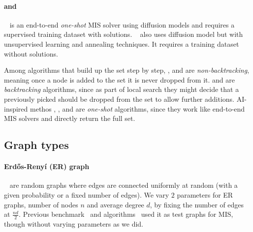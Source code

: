 \paragraph{\difusco and \diffuco} 
\difusco~\citep{sun2023difusco} is an end-to-end \emph{one-shot} MIS solver using diffusion models and requires a supervised training dataset with solutions. \diffuco~\citep{sanokowskidiffusion} also uses diffusion model but with unsupervised learning and annealing techniques. It requires a training dataset without solutions.

Among algorithms that build up the set step by step,  \deggreedy, \gflownets and \lwd are {\em non-backtracking}, meaning once a node is added to the set it is never dropped from it.
\onlinemis and \redumis are \emph{backtracking} algorithms, since as part of local search they might decide that a previously picked should be dropped from the set to allow further additions. 
 AI-inspired methos \pcqo, \difusco, and \diffuco are \emph{one-shot} algorithms, since they work like end-to-end MIS solvers and directly return the full set.




\subsection{Graph types}\label{sec:graph-sketch}

\paragraph{Erd\H{o}s-Reny\'i (ER) graph}
~\citep{erdos59a} are random graphs where edges are connected uniformly at random (with a given probability or a fixed number of edges). We vary $2$ parameters for ER graphs, number of nodes $n$ and average degree $d$, by fixing the number of edges at $\frac{nd}{2}$. 
Previous benchmark~\citep{boether_dltreesearch_2022} and algorithms~\citep{ahn2020learning, sun2023difusco, zhang2023let, alkhouri2024dataless} used it as test graphs for MIS, though without varying parameters as we did. 



